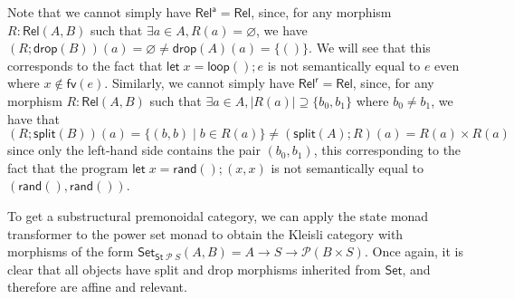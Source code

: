 \documentclass[acmsmall,screen,review]{acmart}
\newcommand{\mc}[1]{\ensuremath{\mathcal{#1}}}
\newcommand{\ms}[1]{\ensuremath{\mathsf{#1}}}
\begin{document}
Note that we cannot simply have \(\ms{Rel}^{\ms{a}} = \ms{Rel}\), since, for any
morphism \(R: \ms{Rel}(A, B)\) such that \(\exists a \in A, R(a) =
\varnothing\), we have \( (R;\ms{drop}(B))(a) = \varnothing \neq \ms{drop}(A)(a)
= \{()\} \). We will see that this corresponds to the fact that \( \ms{let}\;x =
\ms{loop}(); e \) is not semantically equal to \(e\) even where \(x \notin
\ms{fv}(e)\). Similarly, we cannot simply have \(\ms{Rel}^{\ms{r}} = \ms{Rel}\),
since, for any morphism \(R: \ms{Rel}(A, B)\) such that \(\exists a \in A,
|R(a)| \supseteq \{b_0, b_1\}\) where \(b_0 \neq b_1\), we have that
\begin{equation}
  (R;\ms{split}(B))(a) = \{(b, b) \mid b \in R(a)\} \neq (\ms{split}(A);R)(a) = R(a) \times R(a) 
\end{equation}
since only the left-hand side contains the pair \((b_0, b_1)\), this
corresponding to the fact that the program \(\ms{let}\;x = \ms{rand}(); (x, x)\) is
not semantically equal to \((\ms{rand}(), \ms{rand}())\).

To get a substructural premonoidal category, we can apply the state monad
transformer to the power set monad to obtain the Kleisli category with morphisms
of the form \(\ms{Set}_{\ms{St}\;\mc{P}\;S}(A, B) = A \to S \to \mc{P}(B \times
S)\). Once again, it is clear that all objects have split and drop morphisms
inherited from \(\ms{Set}\), and therefore are affine and relevant.
\end{document}
